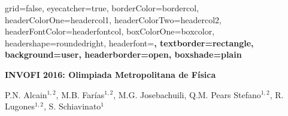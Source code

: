 \documentclass[a0paper,portrait,final,fontscale=0.302]{baposter}
\begin{document}
\begin{poster}{
	grid=false,
	eyecatcher=true, 
	borderColor=bordercol,
	headerColorOne=headercol1,
	headerColorTwo=headercol2,
	headerFontColor=headerfontcol,
	boxColorOne=boxcolor,
	headershape=roundedright,
	headerfont=\Large\sf\bf,
        textborder=rectangle,
	background=user,
	headerborder=open,
        boxshade=plain
}
{\begin{minipage}{2em}
    \hfill\vspace{1in}
  \end{minipage} } %
{\sf\bf \smaller[1]
  INVOFI 2016: Olimpiada Metropolitana de Física
}
{

  {\smaller[1] \vspace{0.1em} P.N. Alcain$^{1,2}$,
    M.B. Farías$^{1,2}$, M.G. Josebachuili, Q.M. Pears
    Stefano$^{1,2}$, R. Lugones$^{1,2}$, S. Schiavinato$^{1}$} \\
  
}
\end{poster}
\end{document}
